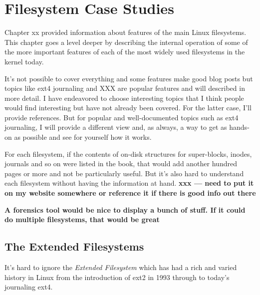 \chapter{Filesystem Case Studies}

Chapter xx provided information about features of the main Linux filesystems. This chapter goes a level deeper by describing the internal operation of some of the more important features of each of the most widely used filesystems in the kernel today.

It's not possible to cover everything and some features make good blog posts but topics like ext4 journaling and XXX are popular features and will described in more detail. I have endeavored to choose interesting topics that I think people would find interesting but have not already been covered. For the latter case, I'll provide references. But for popular and well-documented topics such as ext4 journaling, I will provide a different view and, as always, a way to get as hands-on as possible and see for yourself how it works.

For each filesystem, if the contents of on-disk structures for super-blocks, inodes, journals and so on were listed in the book, that would add another hundred pages or more and not be particularly useful. But it's also hard to understand each filesystem without having the information at hand. \textbf{xxx --- need to put it on my website somewhere or reference it if there is good info out there}

\textbf{A forensics tool would be nice to display a bunch of stuff. If it could do multiple filesystems, that would be great}


\section{The Extended Filesystems}

It's hard to ignore the \textit{Extended Filesystem} which has had a rich and varied history in Linux from the introduction of ext2 in 1993 through to today's journaling ext4.


